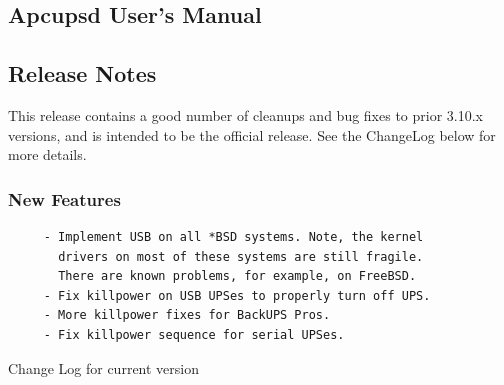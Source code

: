 
\subsection*{Apcupsd User's Manual}
\label{_ChapterStart}

\label{Release-Notes}

\subsection*{Release Notes}

\label{index-Release-Notes-1}
This release contains a good number of cleanups and bug fixes to prior 3.10.x
versions, and is intended to be the official release. See the ChangeLog below
for more details. 

\label{New-Features}

\subsubsection*{New Features}

\label{index-New-Features-2}

\footnotesize
\begin{verbatim}
     - Implement USB on all *BSD systems. Note, the kernel
       drivers on most of these systems are still fragile.
       There are known problems, for example, on FreeBSD.
     - Fix killpower on USB UPSes to properly turn off UPS.
     - More killpower fixes for BackUPS Pros.
     - Fix killpower sequence for serial UPSes.
\end{verbatim}
\normalsize

Change Log for current version 

